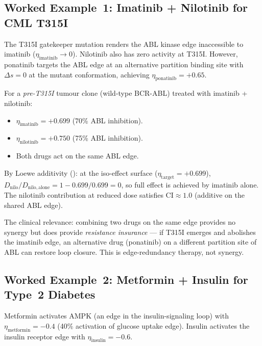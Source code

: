 \subsection{Worked Example~1: Imatinib + Nilotinib for CML T315I}
\label{subsec:ch09-ima-nilo}

The T315I gatekeeper mutation renders the ABL kinase edge inaccessible to
imatinib ($\eta_{\mathrm{imatinib}} \to 0$).  Nilotinib also has zero
activity at T315I.  However, ponatinib targets the ABL edge at an
alternative partition binding site with $\Delta s = 0$ at the mutant
conformation, achieving $\eta_{\mathrm{ponatinib}} = +0.65$.

For a \emph{pre-T315I} tumour clone (wild-type BCR-ABL) treated with
imatinib + nilotinib:
\begin{itemize}[leftmargin=2em]
  \item $\eta_{\mathrm{imatinib}} = +0.699$ (70\% ABL inhibition).
  \item $\eta_{\mathrm{nilotinib}} = +0.750$ (75\% ABL inhibition).
  \item Both drugs act on the same ABL edge.
\end{itemize}
By Loewe additivity (): at the iso-effect surface
($\eta_{\mathrm{target}} = +0.699$),
$D_{\mathrm{nilo}}/D_{\mathrm{nilo,alone}} = 1 - 0.699/0.699 = 0$, so full
effect is achieved by imatinib alone.  The nilotinib contribution at reduced
dose satisfies $\mathrm{CI} \approx 1.0$ (additive on the shared ABL edge).

The clinical relevance: combining two drugs on the same edge provides no
synergy but does provide \emph{resistance insurance} --- if T315I emerges and
abolishes the imatinib edge, an alternative drug (ponatinib) on a different
partition site of ABL can restore loop closure.  This is edge-redundancy
therapy, not synergy.

\subsection{Worked Example~2: Metformin + Insulin for Type~2 Diabetes}
\label{subsec:ch09-met-ins}

Metformin activates AMPK (an edge in the insulin-signaling loop) with
$\eta_{\mathrm{metformin}} = -0.4$ (40\% activation of glucose uptake edge).
Insulin activates the insulin receptor edge with
$\eta_{\mathrm{insulin}} = -0.6$.

